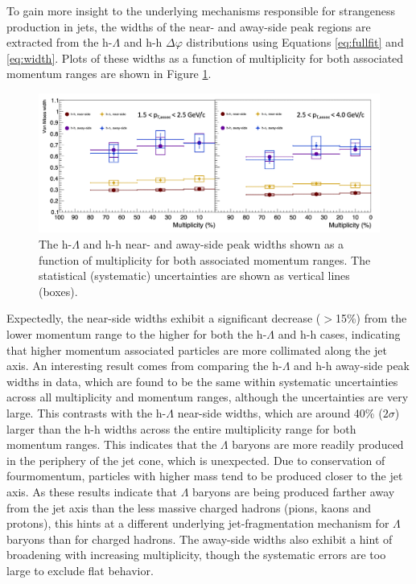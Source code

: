 To gain more insight to the underlying mechanisms responsible for strangeness production in jets, the widths of the near- and away-side peak regions are extracted from the h-$\Lambda$ and h-h $\Delta\varphi$ distributions using Equations \ref{eq:fullfit} and \ref{eq:width}. Plots of these widths as a function of multiplicity for both associated momentum ranges are shown in Figure \ref{fig:jet_widths}.

\begin{figure}[h!]
\centering
\includegraphics[width=\textwidth]{figures/results/widths_plot.png}
\caption{The h-$\Lambda$ and h-h near- and away-side peak widths shown as a function of multiplicity for both associated momentum ranges.  The statistical (systematic) uncertainties are shown as vertical lines (boxes).}
\label{fig:jet_widths}
\end{figure}

Expectedly, the near-side widths exhibit a significant decrease ($>$15\%) from the lower momentum range to the higher for both the h-$\Lambda$ and h-h cases, indicating that higher momentum associated particles are more collimated along the jet axis. An interesting result comes from comparing the h-$\Lambda$ and h-h away-side peak widths in data, which are found to be the same within systematic uncertainties across all multiplicity and momentum ranges, although the uncertainties are very large. This contrasts with the h-$\Lambda$ near-side widths, which are around 40\% ($2\sigma$) larger than the h-h widths across the entire multiplicity range for both momentum ranges. This indicates that the $\Lambda$ baryons are more readily produced in the periphery of the jet cone, which is unexpected. Due to conservation of fourmomentum, particles with higher mass tend to be produced closer to the jet axis. As these results indicate that $\Lambda$ baryons are being produced farther away from the jet axis than the less massive charged hadrons (pions, kaons and protons), this hints at a different underlying jet-fragmentation mechanism for $\Lambda$ baryons than for charged hadrons. The away-side widths also exhibit a hint of broadening with increasing multiplicity, though the systematic errors are too large to exclude flat behavior.

